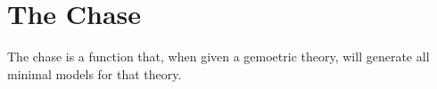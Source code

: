 \section{The Chase}

	The chase is a function that, when given a gemoetric theory, will generate
	all minimal models for that theory.
